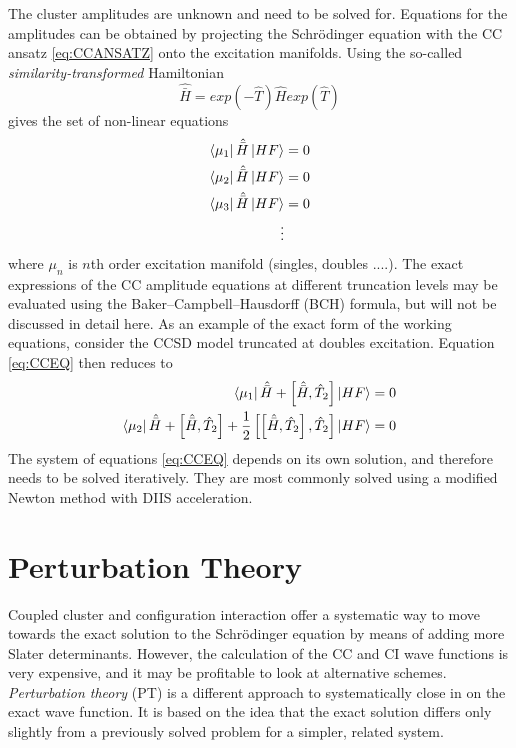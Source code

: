 The cluster amplitudes are unknown and need to be solved for. Equations for the amplitudes can be obtained by projecting the Schrödinger equation with the CC ansatz \ref{eq:CCANSATZ} onto the excitation manifolds. Using the so-called \emph{similarity-transformed} Hamiltonian
\begin{equation}
\hat{\bar{H}} = exp(-\hat{T}) \hat{H} exp(\hat{T})
\end{equation} 
\noindent gives the set of non-linear equations
\begin{align}
\begin{split}
\bra{\mu_1}\hat{\bar{H}}\ket{HF} &= 0 \\
\bra{\mu_2}\hat{\bar{H}}\ket{HF} &= 0 \\
\bra{\mu_3}\hat{\bar{H}}\ket{HF} &= 0 \\
\vdots & 
\end{split} 
\label{eq:CCEQ}
\end{align}
\noindent where $\mu_n$ is $n$th order excitation manifold (singles, doubles ....). The exact expressions of the CC amplitude equations at different truncation levels may be evaluated using the 
Baker–Campbell–Hausdorff (BCH) formula, but will not be discussed in detail here. As an example of the exact form of the working equations, consider the CCSD model truncated at doubles excitation. Equation \ref{eq:CCEQ} then reduces to
\begin{align}
\bra{\smash{\mu_1}} \hat{\bar{H}} + \left[\hat{\bar{H}},\hat{T}_2\right] \ket{\smash{HF}} = 0 
\label{eq:CCSDEQSINGLES}
\\
\bra{\smash{\mu_2}} \hat{\bar{H}} + \left[\hat{\bar{H}},\hat{T}_2\right] + \frac{1}{2} \left[ \left[ \hat{\bar{H}},\hat{T}_2\right],\hat{T}_2\right] \ket{\smash{HF}} = 0
\label{eq:CCSDEQDOUBLES}
\end{align}
The system of equations \ref{eq:CCEQ} depends on its own solution, and therefore needs to be solved iteratively. They are most commonly solved using a modified Newton method with DIIS acceleration. 

\section{Perturbation Theory}

Coupled cluster and configuration interaction offer a systematic way to move towards the exact solution to the Schrödinger equation by means of adding more Slater determinants. However, the calculation of the  CC and CI wave functions is very expensive, and it may be profitable to look at alternative schemes. \emph{Perturbation theory} (PT) is a different approach to systematically close in on the exact wave function. It is based on the idea that the exact solution differs only slightly from a previously solved problem for a simpler, related system.

